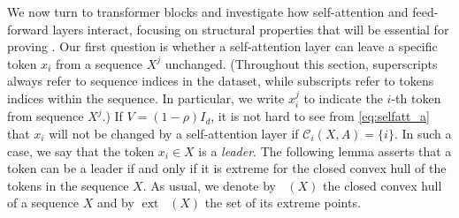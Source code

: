 \documentclass[pdflatex,sn-mathphys-num]{sn-jnl}%
\theoremstyle{thmstyleone}%
\theoremstyle{thmstyletwo}%
\theoremstyle{thmstylethree}%
\numberwithin{equation}{section}
\DeclareMathOperator{\co}{\overline{co}}
\DeclareMathOperator{\ext}{ext}
\begin{document}
We now turn to transformer blocks and investigate how self-attention and feed-forward layers interact, focusing on structural properties that will be essential for proving . Our first question is whether a self-attention layer can leave a specific token $x_i$ from a sequence $X^j$ unchanged. (Throughout this section, superscripts always refer to sequence indices in the dataset, while subscripts refer to tokens indices within the sequence. In particular, we write $x^j_i$ to indicate the $i$-th token from sequence $X^j$.)
If $V = (1 - \rho) I_d$, it is not hard to see from \eqref{eq:selfatt_a} that $x_i$ will not be changed by a self-attention layer if $\mathcal{C}_i(X,A) = \{ i \}$. In such a case, we say that the token $x_i\in X$ is a \textit{leader}. 
The following lemma asserts that a token can be a leader if and only if it is extreme for the closed convex hull of the tokens in the sequence $X$. As usual, we denote by $\co (X)$ the closed convex hull of a sequence $X$ and by $\ext \co (X)$ the set of its extreme points.
\end{document}
